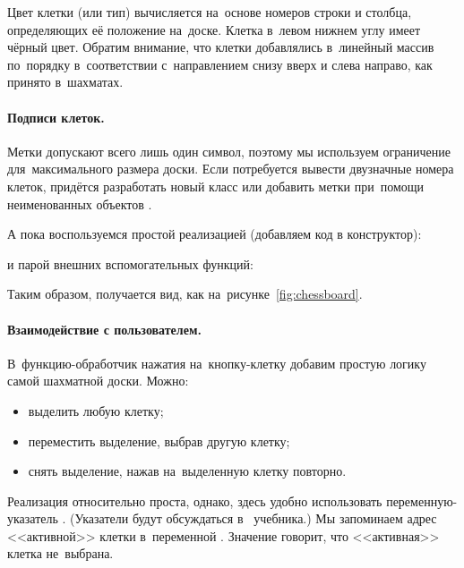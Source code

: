 Цвет клетки (или тип) вычисляется на~основе номеров строки и столбца, определяющих её положение на~доске. Клетка в~левом нижнем углу имеет чёрный цвет. Обратим внимание, что клетки добавлялись в~линейный массив по~порядку в~соответствии с~направлением снизу вверх и слева направо, как принято в~шахматах.




\paragraph{Подписи клеток.}
Метки  допускают всего лишь один символ, поэтому мы используем ограничение  для~максимального размера доски. Если потребуется вывести двузначные номера клеток, придётся разработать новый класс или добавить метки при~помощи неименованных объектов .

А пока воспользуемся простой реализацией (добавляем код в конструктор):


\noindent и парой внешних вспомогательных функций:


\noindent Таким образом, получается вид, как на~рисунке~\ref{fig:chessboard}.



\paragraph{Взаимодействие с пользователем.}
В~функцию-обработчик нажатия на~кнопку-клетку добавим простую логику самой шахматной доски. Можно:
\begin{itemize}
 \item выделить любую клетку;
 \item переместить выделение, выбрав другую клетку;
 \item снять выделение, нажав на~выделенную клетку повторно.
\end{itemize}

\noindent Реализация относительно проста, однако, здесь удобно использовать переменную-указатель . (Указатели будут обсуждаться в~ учебника.) Мы запоминаем адрес <<активной>> клетки в~переменной . Значение  говорит, что <<активная>> клетка не~выбрана.

